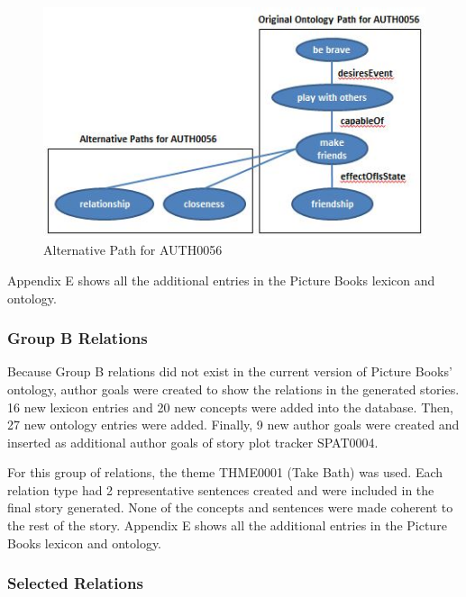 \begin{figure}[h]                %
   \centering                    %
   \includegraphics{altpatheffectofisstate.jpg}      %
   \caption{Alternative Path for AUTH0056}
    \label{fig:altpatheffectofisstate}
\end{figure}

Appendix E shows all the additional entries in the Picture Books lexicon and ontology.

\subsubsection*{Group B Relations}

Because Group B relations did not exist in the current version of Picture Books' ontology, author goals were created to show the relations in the generated stories. 16 new lexicon entries and 20 new concepts were added into the database. Then, 27 new ontology entries were added. Finally, 9 new author goals were created and inserted as additional author goals of story plot tracker SPAT0004. 

For this group of relations, the theme THME0001 (Take Bath) was used. Each relation type had 2 representative sentences created and were included in the final story generated. None of the concepts and sentences were made coherent to the rest of the story. Appendix E shows all the additional entries in the Picture Books lexicon and ontology.

\subsubsection{Selected Relations}
\label{sec:selectedrelations}

